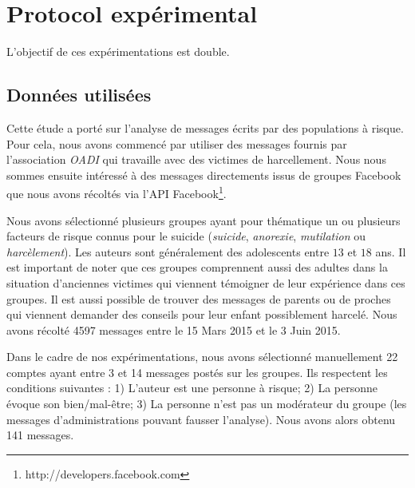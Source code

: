 \section{Protocol expérimental}\label{protocole}

L'objectif de ces expérimentations est double.


\subsection{Données utilisées}
Cette étude a porté sur l'analyse de messages écrits par des populations à risque. Pour cela, nous avons commencé par utiliser des messages fournis par l'association \textit{OADI} qui travaille avec des victimes de harcellement. Nous nous sommes ensuite intéressé à des messages directements issus de groupes Facebook que nous avons récoltés via l'API Facebook\footnote{http://developers.facebook.com}.

Nous avons sélectionné plusieurs groupes ayant pour thématique un ou plusieurs facteurs de risque connus pour le suicide (\emph{suicide}, \emph{anorexie}, \emph{mutilation} ou \emph{harcèlement}). Les auteurs sont généralement des adolescents entre $13$ et $18$ ans. Il est important de noter que ces groupes comprennent aussi des adultes dans la situation d'anciennes victimes  qui viennent témoigner de leur expérience dans ces groupes. Il est aussi possible de trouver des messages de parents ou de proches qui viennent demander des conseils pour leur enfant possiblement harcelé. Nous avons récolté 4597 messages entre le 15 Mars 2015 et le 3 Juin 2015.

Dans le cadre de nos expérimentations, nous avons sélectionné manuellement 22 comptes ayant entre 3 et 14 messages postés sur les groupes. Ils respectent les conditions suivantes : 1) L'auteur est une personne à risque; 2) La personne évoque son bien/mal-être; 3) La personne n'est pas un modérateur du groupe (les messages d'administrations pouvant fausser l'analyse). Nous avons alors obtenu 141 messages.

